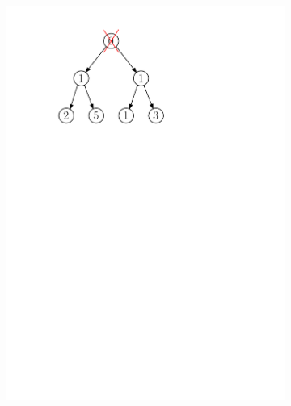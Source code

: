 \begin{figure}[h]
    \centering
    \begin{subfigure}{5cm}
        \includegraphics[scale=.5]{01-grafalgo/images/ch01_odebirani_1}
    \end{subfigure}
    \begin{subfigure}{5cm}

\end{subfigure}
\end{figure}
